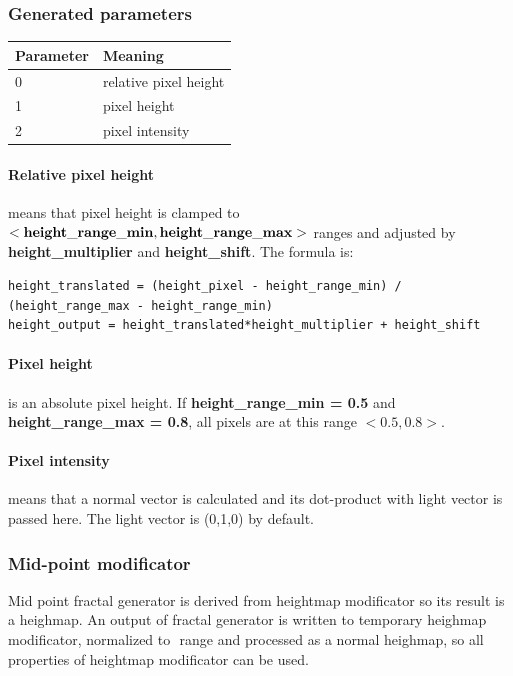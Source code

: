\documentclass[9pt]{article}
\begin{document}
\subsubsection*{Generated parameters}
\begin{tabular}{|l||l|}
\hline
  Parameter & Meaning \\
\hline
\hline
  0 & relative pixel height \\
  1 & pixel height \\
  2 & pixel intensity \\
\hline
\end{tabular}

\paragraph*{Relative pixel height}
means that pixel height is clamped to \begin{math}{\bf<height\_range\_min, height\_range\_max>}\end{math}
ranges and adjusted by {\bf height\_multiplier} and {\bf height\_shift}.
The formula is:
\begin{verbatim}
height_translated = (height_pixel - height_range_min) / (height_range_max - height_range_min)
height_output = height_translated*height_multiplier + height_shift
\end{verbatim}

\paragraph*{Pixel height} is an absolute pixel height. 
If {\bf height\_range\_min = 0.5} and {\bf height\_range\_max = 0.8},
all pixels are at this range \begin{math}<0.5,0.8>\end{math}.

\paragraph*{Pixel intensity} means that a normal vector is 
calculated and its dot-product with light vector 
is passed here. The light vector is (0,1,0) by default.

\subsubsection{Mid-point modificator}

Mid point fractal generator is derived from heightmap modificator
so its result is a heighmap. An output of fractal generator is written to 
temporary heighmap modificator, normalized to \begin{math}<0,1>\end{math} 
range and processed as a normal heighmap, so all properties of heightmap 
modificator can be used.
\end{document}
